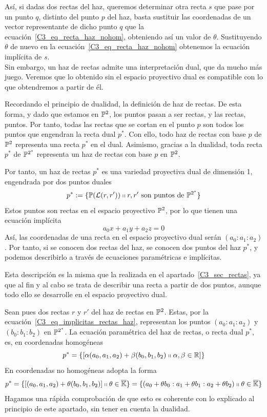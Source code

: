 Así, si dadas dos rectas del haz, queremos determinar otra recta $s$ que pase por un punto $q$, distinto del punto $p$ del haz, basta sustituir las coordenadas de un vector representante de dicho punto $q$ que la ecuación~\eqref{C3_eq_recta_haz_nohom}, obteniendo así un valor de $\theta$. Sustituyendo $\theta$ de nuevo en la ecuación~\eqref{C3_eq_recta_haz_nohom} obtenemos la ecuación implícita de $s$.\\

Sin embargo, un haz de rectas admite una interpretación dual, que da mucho más juego. Veremos que lo obtenido sin el espacio proyectivo dual es compatible con lo que obtendremos a partir de él.

Recordando el principio de dualidad,  la definición de haz de rectas. De esta forma, y dado que estamos en $\mathbb{P}^2$, los puntos pasan a ser rectas, y las rectas, puntos. Por tanto, todas las rectas que se cortan en el punto $p$ son todos los puntos que engendran la recta dual $p^*$. Con ello, todo haz de rectas con base $p$ de $\mathbb{P}^2$ representa una recta $p^*$ en el dual. Asimismo, gracias a la dualidad, toda recta $p^*$ de $\mathbb{P}^{2^*}$ representa un haz de rectas con base $p$ en $\mathbb{P}^2$.

Por tanto, un haz de rectas $p^*$ es una variedad proyectiva dual de dimensión 1, engendrada por dos puntos duales
\begin{equation}
	p^*:=\{\mathbb{P}(\mathcal{L}(r,r'))\shortparallel r,r'\text{ son puntos de }\mathbb{P}^{2^*}\}
\end{equation}
Estos puntos son rectas en el espacio proyectivo $\mathbb{P}^2$, por lo que tienen una ecuación implícita
\begin{equation*}
	a_0x+a_1y+a_2z=0
\end{equation*}
Así, las coordenadas de una recta en el espacio proyectivo dual serán $(a_0:a_1:a_2)$. Por tanto, si se conocen dos rectas del haz, se conocen dos puntos del haz $p^*$, y podemos describirlo a través de ecuaciones paramétricas e implícitas. 

Esta descripción es la misma que la realizada en el apartado~\ref{C3_sec_rectas}, ya que al fin y al cabo se trata de describir una recta a partir de dos puntos, aunque todo ello se desarrolle en el espacio proyectivo dual. 

Sean pues dos rectas $r$ y $r'$ del haz de rectas en $\mathbb{P}^2$. Estas, por la ecuación~\eqref{C3_eq_implicitas_rectas_haz}, representan los puntos $(a_0:a_1:a_2)$ y $(b_0:b_1:b_2)$ en $\mathbb{P}^{2^*}$. La ecuación paramétrica del haz de rectas, o recta dual $p^*$, es, en coordenadas homogéneas
\begin{equation}
	p^*=\{\left [ \alpha (a_0,a_1,a_2)+\beta (b_0,b_1,b_2)\shortparallel \alpha,\beta\in\mathbb{R} \right ]\}
\end{equation}
En coordenadas no homogéneas adopta la forma
\begin{equation}
p^*=\{\left [ (a_0,a_1,a_2)+\theta (b_0,b_1,b_2) \right ]\shortparallel \theta\in\overline{\mathbb{K}}\}=\{(a_0+\theta b_0:a_1+\theta b_1:a_2+\theta b_2)\shortparallel \theta\in\overline{\mathbb{K}}\}
\end{equation}
Hagamos una rápida comprobación de que esto es coherente con lo explicado al principio de este apartado, sin tener en cuenta la dualidad. 

